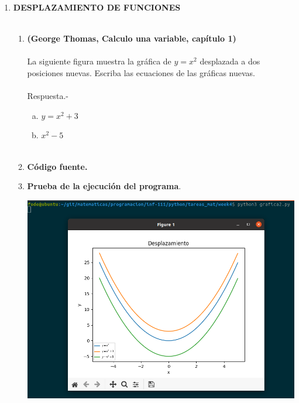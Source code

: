 \begin{enumerate}
\item \textbf{\large DESPLAZAMIENTO DE FUNCIONES}\\\\

    \begin{enumerate}[\bfseries a)]

	\item \textbf{(George Thomas, Calculo una variable, capítulo 1)}\\\\ 
	    La siguiente figura muestra la gráfica de $y=x^2$ desplazada a dos posiciones nuevas. Escriba las ecuaciones de las gráficas nuevas.\\\\
	    Respuesta.-\; 
	    \begin{enumerate}[a)]
		\item $y=x^2 + 3$\\
		\item $x^2 - 5$\\\\
	    \end{enumerate}

	\item \textbf{Código fuente.}\\ 
	    
	    
	    \vspace{.5cm}
	
	\item \textbf{Prueba de la ejecución del programa}.\\
	    \begin{center}
		\includegraphics[scale=.4]{imagenes/tareas_mat/week4/grafica2.png}
	    \end{center}


\end{enumerate}
\end{enumerate}
